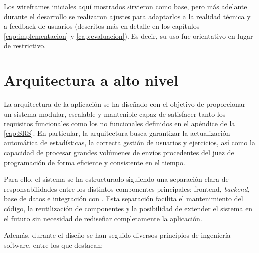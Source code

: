 Los wireframes iniciales aquí mostrados sirvieron como base, pero más adelante durante el desarrollo se realizaron ajustes para adaptarlos a la realidad técnica y a feedback de usuarios (descritos más en detalle en los capítulos \ref{cap:implementacion} y \ref{cap:evaluacion}). Es decir, su uso fue orientativo en lugar de restrictivo. 

\section{Arquitectura a alto nivel}

La arquitectura de la aplicación se ha diseñado con el objetivo de proporcionar un sistema modular, escalable y mantenible capaz de satisfacer tanto los requisitos funcionales como los no funcionales definidos en el apéndice de la \ref{cap:SRS}. En particular, la arquitectura busca garantizar la actualización automática de estadísticas, la correcta gestión de usuarios y ejercicios, así como la capacidad de procesar grandes volúmenes de envíos procedentes del juez de programación de forma eficiente y consistente en el tiempo.

Para ello, el sistema se ha estructurado siguiendo una separación clara de responsabilidades entre los distintos componentes principales: frontend, \textit{backend}, base de datos e integración con \aer. Esta separación facilita el mantenimiento del código, la reutilización de componentes y la posibilidad de extender el sistema en el futuro sin necesidad de rediseñar completamente la aplicación.

Además, durante el diseño se han seguido diversos principios de ingeniería software, entre los que destacan:

